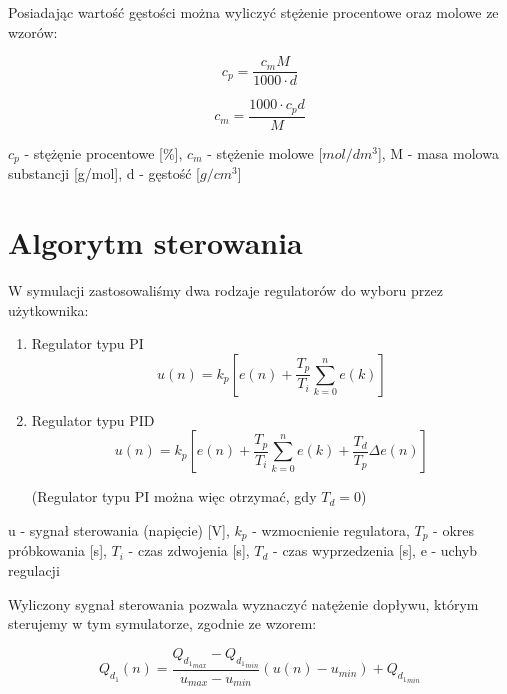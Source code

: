\documentclass[polish,polish,a4paper,12pt]{article}
\begin{document}
	Posiadając wartość gęstości można wyliczyć stężenie procentowe oraz molowe ze wzorów:
	
	\begin{equation*}
		c_p = \frac{c_mM}{1000 \cdot d}
	\end{equation*}
	
	\begin{equation*}
		c_m = \frac{1000 \cdot c_p d}{M}
	\end{equation*}
	
	{\small $c_p$ - stężęnie procentowe [\%], \hspace{1em} $c_m$ - stężenie molowe [$mol/dm^3$], \hspace{1em} M - masa molowa substancji [g/mol], \hspace{1em} d - gęstość [$g/cm^3$]}
	
	\section{Algorytm sterowania}
	
	W symulacji zastosowaliśmy dwa rodzaje regulatorów do wyboru przez użytkownika:
	
	\begin{enumerate}
		\item Regulator typu PI
		\begin{equation*}
			u(n) = k_p\left[e(n) + \frac{T_p}{T_i}\sum_{k=0}^{n}e(k)\right]
		\end{equation*}
		\item Regulator typu PID
		\begin{equation*}
			u(n) = k_p\left[e(n) + \frac{T_p}{T_i}\sum_{k=0}^{n}e(k) + \frac{T_d}{T_p}\Delta e(n)\right]
		\end{equation*}
		\begin{center}
			\small(Regulator typu PI można więc otrzymać, gdy $T_d = 0$)
		\end{center}
	\end{enumerate}
	
	\small{u - sygnał sterowania (napięcie) [V], $k_p$ - wzmocnienie regulatora, $T_p$ - okres próbkowania [s], $T_i$ - czas zdwojenia [s], $T_d$ - czas wyprzedzenia [s], e - uchyb regulacji}
	
	Wyliczony sygnał sterowania pozwala wyznaczyć natężenie dopływu, którym sterujemy w tym symulatorze, zgodnie ze wzorem:
	
	\begin{equation*}
		Q_{d_{1}}(n) = \frac{Q_{{d_{1}}_{max}} - Q_{{d_{1}}_{min}}}{u_{max} - u_{min}}\left(u(n) - u_{min}\right) + Q_{{d_{1}}_{min}}
	\end{equation*}
	
\end{document}

